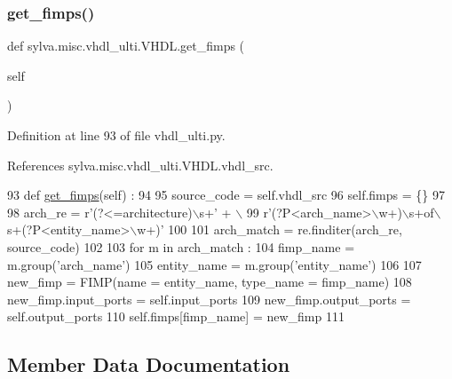 \subsubsection{\texorpdfstring{get\+\_\+fimps()}{get\_fimps()}}
{\footnotesize\ttfamily def sylva.\+misc.\+vhdl\+\_\+ulti.\+V\+H\+D\+L.\+get\+\_\+fimps (\begin{DoxyParamCaption}\item[{}]{self }\end{DoxyParamCaption})}



Definition at line 93 of file vhdl\+\_\+ulti.\+py.



References sylva.\+misc.\+vhdl\+\_\+ulti.\+V\+H\+D\+L.\+vhdl\+\_\+src.


\begin{DoxyCode}
93   \textcolor{keyword}{def }\hyperlink{namespacesylva_1_1code__generation_1_1vhdl__interface__parser_a58e8d5a1d080f5c440889bddbbbb514a}{get\_fimps}(self) :
94 
95     source\_code = self.vhdl\_src
96     self.fimps = \{\}
97 
98     arch\_re = \textcolor{stringliteral}{r'(?<=architecture)\(\backslash\)s+'} + \(\backslash\)
99               \textcolor{stringliteral}{r'(?P<arch\_name>\(\backslash\)w+)\(\backslash\)s+of\(\backslash\)s+(?P<entity\_name>\(\backslash\)w+)'}
100 
101     arch\_match = re.finditer(arch\_re, source\_code)
102 
103     \textcolor{keywordflow}{for} m \textcolor{keywordflow}{in} arch\_match :
104       fimp\_name = m.group(\textcolor{stringliteral}{'arch\_name'})
105       entity\_name = m.group(\textcolor{stringliteral}{'entity\_name'})
106 
107       new\_fimp = FIMP(name = entity\_name, type\_name = fimp\_name)
108       new\_fimp.input\_ports = self.input\_ports
109       new\_fimp.output\_ports = self.output\_ports
110       self.fimps[fimp\_name] = new\_fimp
111 
\end{DoxyCode}


\subsection{Member Data Documentation}
\mbox{\label{classsylva_1_1misc_1_1vhdl__ulti_1_1_v_h_d_l_a38e49d67a85050815c60101143bb880b}} 
